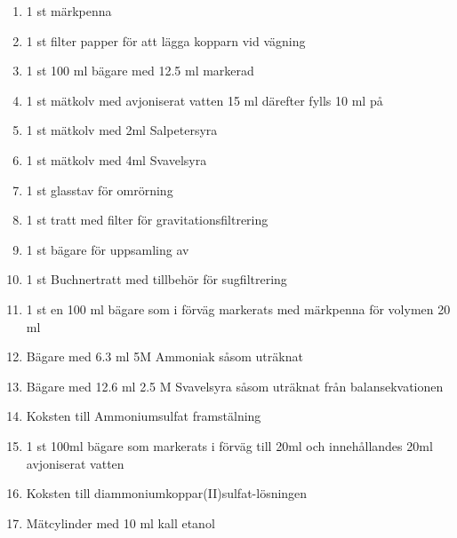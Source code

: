 \documentclass[./chem_exercises.tex]{subfiles}
\begin{document}
\begin{enumerate}
\item 1 st märkpenna
\item 1 st filter papper för att lägga kopparn vid vägning
\item 1 st 100 ml bägare med 12.5 ml markerad
\item 1 st mätkolv med avjoniserat vatten 15 ml därefter fylls 10 ml på
\item 1 st mätkolv med 2ml Salpetersyra
\item 1 st mätkolv med 4ml Svavelsyra
\item 1 st glasstav för omrörning
\item 1 st tratt med filter för gravitationsfiltrering
\item 1 st bägare för uppsamling av 
\item 1 st Buchnertratt med tillbehör för sugfiltrering
\item 1 st en 100 ml bägare som i förväg markerats med
märkpenna för volymen 20 ml
\item Bägare med 6.3 ml 5M Ammoniak såsom uträknat\leavevmode{}
\item Bägare med 12.6 ml  2.5 M Svavelsyra såsom uträknat från balansekvationen
\item Koksten till Ammoniumsulfat framstälning
\item 1 st 100ml bägare som markerats i förväg till 20ml och innehållandes 20ml avjoniserat vatten
\item Koksten till diammoniumkoppar(II)sulfat-lösningen
\item Mätcylinder med 10 ml kall etanol



\end{enumerate}
\end{document}
